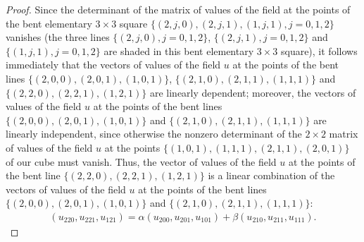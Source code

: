 \begin{proof}
Since the determinant of the matrix of values of the f\/ield at the
points of the bent elementary $3 \times 3$ square $\{(2, j, 0), (2,
j, 1), (1, j, 1), j = 0, 1, 2\}$ vanishes (the three lines $\{(2, j,
0), j = 0, 1, 2\}$, $\{(2, j, 1), j = 0, 1, 2\}$ and $\{(1, j, 1), j
= 0, 1, 2\}$ are shaded in this bent elementary $3 \times 3$
square), it follows immediately that the vectors of values of the
f\/ield $u$ at the points of the bent lines $\{(2, 0, 0), (2, 0, 1),
(1, 0, 1)\}$, $\{(2, 1, 0), (2, 1, 1), (1, 1, 1)\}$ and $\{(2, 2,
0), (2, 2, 1), (1, 2, 1)\}$ are linearly dependent; moreover, the
vectors of values of the f\/ield $u$ at the points of the bent lines
$\{(2, 0, 0), (2, 0, 1), (1, 0, 1)\}$ and $\{(2, 1, 0), (2, 1, 1),
(1, 1, 1)\}$ are linearly independent, since otherwise the nonzero
determinant of the $2 \times 2$ matrix of values of the f\/ield $u$ at
the points $\{(1, 0, 1), (1, 1, 1), (2, 1, 1), (2, 0, 1)\}$ of our
cube must vanish. Thus, the vector of values of the f\/ield $u$ at the
points of the bent line $\{(2, 2, 0), (2, 2, 1), (1, 2, 1)\}$ is a
linear combination of the vectors of values of the f\/ield $u$ at the
points of the bent lines $\{(2, 0, 0), (2, 0, 1), (1, 0, 1)\}$ and
$\{(2, 1, 0), (2, 1, 1), (1, 1, 1)\}$: \begin{gather} (u_{2 2 0}, u_{2 2 1},
u_{1 2 1}) = \alpha (u_{2 0 0}, u_{2 0 1}, u_{1 0 1}) + \beta (u_{2
1 0}, u_{2 1 1}, u_{1 1 1}). \label{7xxyb2} \end{gather}



\end{proof}
